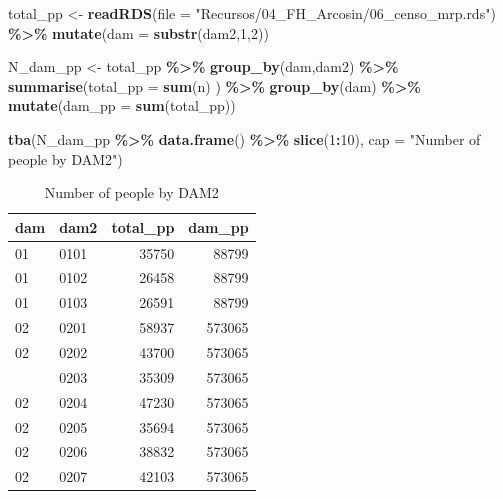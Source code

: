 \documentclass[
  12pt,
]{book}
\newenvironment{Shaded}{\begin{snugshade}}{\end{snugshade}}
\newcommand{\AttributeTok}[1]{\textcolor[rgb]{0.13,0.29,0.53}{#1}}
\newcommand{\DecValTok}[1]{\textcolor[rgb]{0.00,0.00,0.81}{#1}}
\newcommand{\FunctionTok}[1]{\textcolor[rgb]{0.13,0.29,0.53}{\textbf{#1}}}
\newcommand{\NormalTok}[1]{#1}
\newcommand{\OtherTok}[1]{\textcolor[rgb]{0.56,0.35,0.01}{#1}}
\newcommand{\SpecialCharTok}[1]{\textcolor[rgb]{0.81,0.36,0.00}{\textbf{#1}}}
\newcommand{\StringTok}[1]{\textcolor[rgb]{0.31,0.60,0.02}{#1}}
\begin{document}
\begin{Shaded}
\begin{Highlighting}[]
\NormalTok{total\_pp }\OtherTok{\textless{}{-}} \FunctionTok{readRDS}\NormalTok{(}\AttributeTok{file =} \StringTok{"Recursos/04\_FH\_Arcosin/06\_censo\_mrp.rds"}\NormalTok{) }\SpecialCharTok{\%\textgreater{}\%} 
   \FunctionTok{mutate}\NormalTok{(}\AttributeTok{dam =} \FunctionTok{substr}\NormalTok{(dam2,}\DecValTok{1}\NormalTok{,}\DecValTok{2}\NormalTok{))}


\NormalTok{N\_dam\_pp }\OtherTok{\textless{}{-}}\NormalTok{ total\_pp }\SpecialCharTok{\%\textgreater{}\%}   \FunctionTok{group\_by}\NormalTok{(dam,dam2) }\SpecialCharTok{\%\textgreater{}\%}  
            \FunctionTok{summarise}\NormalTok{(}\AttributeTok{total\_pp =} \FunctionTok{sum}\NormalTok{(n) ) }\SpecialCharTok{\%\textgreater{}\%} 
  \FunctionTok{group\_by}\NormalTok{(dam) }\SpecialCharTok{\%\textgreater{}\%} \FunctionTok{mutate}\NormalTok{(}\AttributeTok{dam\_pp =} \FunctionTok{sum}\NormalTok{(total\_pp))}

\FunctionTok{tba}\NormalTok{(N\_dam\_pp }\SpecialCharTok{\%\textgreater{}\%} \FunctionTok{data.frame}\NormalTok{() }\SpecialCharTok{\%\textgreater{}\%} \FunctionTok{slice}\NormalTok{(}\DecValTok{1}\SpecialCharTok{:}\DecValTok{10}\NormalTok{),}
    \AttributeTok{cap =} \StringTok{"Number of people by DAM2"}\NormalTok{)}
\end{Highlighting}
\end{Shaded}

\begin{table}[H]

\caption{\label{tab:unnamed-chunk-17}Number of people by DAM2}
\centering
\begin{tabular}[t]{llrr}
\toprule
dam & dam2 & total\_pp & dam\_pp\\
\midrule
01 & 0101 & 35750 & 88799\\
01 & 0102 & 26458 & 88799\\
01 & 0103 & 26591 & 88799\\
02 & 0201 & 58937 & 573065\\
02 & 0202 & 43700 & 573065\\
\addlinespace
02 & 0203 & 35309 & 573065\\
02 & 0204 & 47230 & 573065\\
02 & 0205 & 35694 & 573065\\
02 & 0206 & 38832 & 573065\\
02 & 0207 & 42103 & 573065\\
\bottomrule
\end{tabular}
\end{table}
\end{document}
